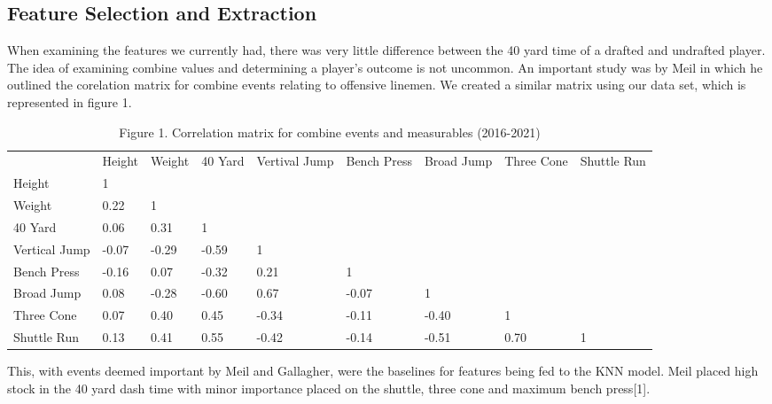 \documentclass[confrence]{IEEEtran}
\begin{document}
\subsection*{Feature Selection and Extraction}
When examining the features we currently had, there was very little difference between the 40 yard time of a drafted and undrafted player.
The idea of examining combine values and determining a player's outcome is not uncommon.
An important study was by Meil in which he outlined the corelation matrix for combine events relating to offensive linemen.
We created a similar matrix using our data set, which is represented in figure 1.
\begin{table*}[htbp]
    \begin{tabular}{lllllllll}
                      & Height & Weight & 40 Yard & Vertival Jump & Bench Press & Broad Jump & Three Cone & Shuttle Run \\
        Height        & 1      &        &         &               &             &            &        &             \\
        Weight        & 0.22   & 1      &         &               &             &            &        &             \\
        40 Yard       & 0.06   & 0.31   & 1       &               &             &            &        &             \\
        Vertical Jump & -0.07  & -0.29  & -0.59   & 1             &             &            &        &             \\
        Bench Press   & -0.16  & 0.07   & -0.32   & 0.21          & 1           &            &        &             \\
        Broad Jump    & 0.08   & -0.28  & -0.60   & 0.67          & -0.07       & 1          &        &             \\
        Three Cone        & 0.07   & 0.40   & 0.45    & -0.34         & -0.11       & -0.40      & 1      &             \\
        Shuttle Run   & 0.13   & 0.41   & 0.55    & -0.42         & -0.14       & -0.51      & 0.70   & 1
    \end{tabular}
    \caption*{Figure 1. Correlation matrix for combine events and measurables (2016-2021)}
\end{table*}
This, with events deemed important by Meil and Gallagher, were the baselines for features being fed to the KNN model.
Meil placed high stock in the 40 yard dash time with minor importance placed on the shuttle, three cone and maximum bench press[1].
\end{document}
